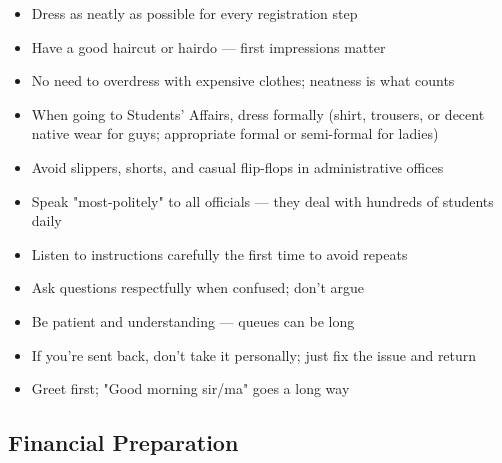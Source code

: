 \documentclass[11pt,a4paper]{article}
\begin{document}
\begin{tcolorbox}[colback=lightGray,colframe=successGreen,title={\color{white}\textbf{�� Dress Code}},colbacktitle=successGreen,arc=4pt,breakable]
\begin{itemize}[leftmargin=1em, itemsep=0.2em]
    \item Dress as neatly as possible for every registration step
    \item Have a good haircut or hairdo --- first impressions matter
    \item No need to overdress with expensive clothes; neatness is what counts
    \item When going to Students' Affairs, dress formally (shirt, trousers, or decent native wear for guys; appropriate formal or semi-formal for ladies)
    \item Avoid slippers, shorts, and casual flip-flops in administrative offices
\end{itemize}
\end{tcolorbox}

\begin{tcolorbox}[colback=lightGray,colframe=successGreen,title={\color{white}\textbf{��️ Communication}},colbacktitle=successGreen,arc=4pt,breakable]
\begin{itemize}[leftmargin=1em, itemsep=0.2em]
    \item Speak "most-politely" to all officials --- they deal with hundreds of students daily
    \item Listen to instructions carefully the first time to avoid repeats
    \item Ask questions respectfully when confused; don't argue
    \item Be patient and understanding --- queues can be long
    \item If you're sent back, don't take it personally; just fix the issue and return
    \item Greet first; "Good morning sir/ma" goes a long way
\end{itemize}
\end{tcolorbox}

\subsection{Financial Preparation}
\end{document}
